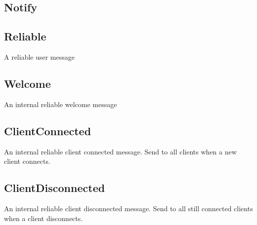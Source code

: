\subsection{Notify}

\begin{messagedef}
\end{messagedef}

\subsection{Reliable}
A reliable user message

\begin{messagedef}
\end{messagedef}

\subsection{Welcome}
An internal reliable welcome message

\begin{messagedef}
\end{messagedef}

\subsection{ClientConnected}
An internal reliable client connected message. Send to all clients when a new client connects.

\begin{messagedef}
\end{messagedef}

\subsection{ClientDisconnected}
An internal reliable client disconnected message. Send to all still connected clients when a client disconnects.

\begin{messagedef}
\end{messagedef}


